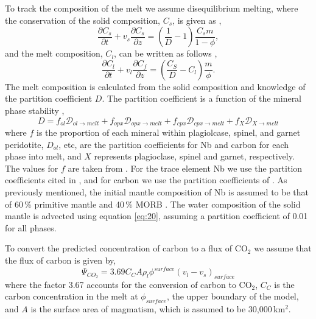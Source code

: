 \documentclass[draft,grl]{agutexSI2018}
\begin{document}
\begin{article}
To track the composition of the melt we assume disequilibrium melting, where the conservation of the solid composition, $C_{s}$, is given as \citep{spiegelman-1996},
\begin{equation}
\frac{\partial C_{s}}{\partial t} + v_{s}\frac{\partial C_{s}}{\partial z} = \left(\frac{1}{D} - 1\right) \frac{C_{s}m}{1-\phi},
\label{eq:20}
\end{equation}
and the melt composition, $C_{l}$, can be written as follows \citep{spiegelman-1996},
\begin{equation}
\frac{\partial C_{l}}{\partial t} + v_{l}\frac{\partial C_{f}}{\partial z} = \left(\frac{C_{S}}{D} - C_{l}\right)\frac{m}{\phi}.
\label{eq:21}
\end{equation}
The melt composition is calculated from the solid composition and knowledge of the partition coefficient $D$. The partition coefficient is a function of the mineral phase stability \citep{mckenzie-1991},
\begin{equation}
D = f_{ol}\mathcal{D}_{ol\rightarrow melt} + f_{opx}\mathcal{D}_{opx\rightarrow melt} + f_{cpx}\mathcal{D}_{cpx\rightarrow melt} + f_{X}\mathcal{D}_{X\rightarrow melt}
\label{eq:22}
\end{equation}
where $f$ is the proportion of each mineral within plagiolcase, spinel, and garnet peridotite, $D_{ol}$, etc, are the partition coefficients for Nb and carbon for each phase into melt, and $X$ represents plagioclase, spinel and garnet, respectively. The values for $f$ are taken from \citet{gibson-2010}. For the trace element Nb we use the partition coefficients cited in \citet{gurenko-1995}, and for carbon we use the partition coefficients of \citet{rosenthal-etal-2015}. As previously mentioned, the initial mantle composition of Nb is assumed to be that of 60\,\% primitive mantle and 40\,\% MORB \citep{shorttle-2011}. The water composition of the solid mantle is advected using equation \ref{eq:20}, assuming a partition coefficient of 0.01 for all phases.

To convert the predicted concentration of carbon to a flux of CO$_{2}$ we assume that the flux of carbon is given by,
\begin{equation}
\Psi_{CO_{2}} = 3.69 C_{C} A\rho_{l} \phi^{surface} \left(v_{l} - v_{s} \right)_{surface}
\label{eq:23}
\end{equation}
where the factor 3.67 accounts for the conversion of carbon to CO$_{2}$, $C_{C}$ is the carbon concentration in the melt at $\phi_{surface}$, the upper boundary of the model, and $A$ is the surface area of magmatism, which is assumed to be 30,000\,km$^{2}$.


\end{article}
\end{document}
